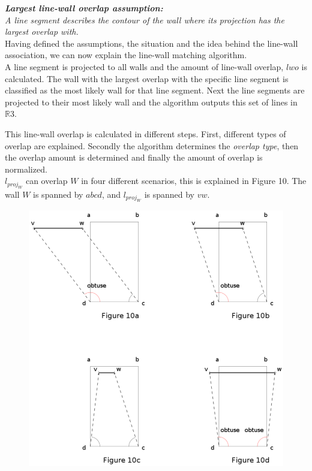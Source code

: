 	\textbf{	\emph{Largest line-wall overlap assumption:}}\\
	\emph{A line segment describes the contour of the wall where its projection
	has the largest overlap with.}\\

	Having defined the assumptions, the situation and the idea behind the
	line-wall association, we can now explain the line-wall matching algorithm.\\ 

	A line segment is projected to all walls and the amount of line-wall
	overlap, $lwo$ is calculated. The wall with the largest overlap with the specific line
segment is classified as the most likely wall for that line segment.
	Next the line segments are projected to their most likely wall and the
	algorithm outputs this set of lines in $\mathbb{R}3$. 
	

	This line-wall overlap is calculated in different steps.
	First, different types of overlap are explained. Secondly the algorithm
	determines the \emph{overlap type}, then the overlap amount is determined and
	finally the amount of overlap is normalized.\\

	$l_{proj_W}$ can overlap $W$ in four different scenarios, this is explained
	in Figure 10. The wall $W$ is spanned by $abcd$, and $l_{proj_W}$ is spanned
	by $vw$.
	

	\begin{figure}[!ht]
	\centering
	\includegraphics[width=12cm]{img/overlaytypes.png}
	\end{figure}
		

